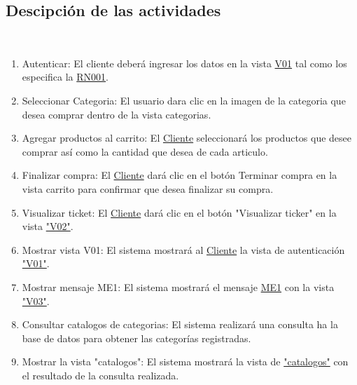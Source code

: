 \subsection{Descipci\'on de las actividades}
\textit{\\}
	\begin{enumerate}
		\item Autenticar: El cliente deber\'a ingresar los datos en la vista \hyperlink{V01}{V01} tal como los especifica la \hyperlink{RN001}{RN001}. \\
		
		\item Seleccionar Categoria: El usuario dara clic en la imagen de la categoria que desea comprar dentro de la vista categorias. \\
		
		\item Agregar productos al carrito: El \hyperlink{Cliente}{Cliente} seleccionar\'a los productos que desee comprar as\'i como la cantidad que desea de cada articulo.  \\
		
		\item Finalizar compra: El \hyperlink{Cliente}{Cliente} dar\'a clic en el bot\'on Terminar compra en la vista carrito para confirmar que desea finalizar su compra. \\
		
		\item Visualizar ticket: El \hyperlink{Cliente}{Cliente} dar\'a clic en el bot\'on "Visualizar ticker" en la vista \hyperlink{V02}{"V02"}. \\
		
		\item Mostrar vista V01: El sistema mostrar\'a al \hyperlink{Cliente}{Cliente} la vista de autenticaci\'on \hyperlink{V01}{"V01"}. \\
		
		\item Mostrar mensaje ME1: El sistema mostrar\'a el mensaje \hyperlink{ME1}{ME1} con la vista \hyperlink{V03}{"V03"}. \\
		
		\item Consultar catalogos de categorias: El sistema realizar\'a una consulta ha la base de datos para obtener las categor\'ias registradas. \\
		
		\item Mostrar la vista "catalogos": El sistema mostrar\'a la vista de \hyperlink{catalogos}{"catalogos"} con el resultado de la consulta realizada. \\
		

\end{enumerate}
